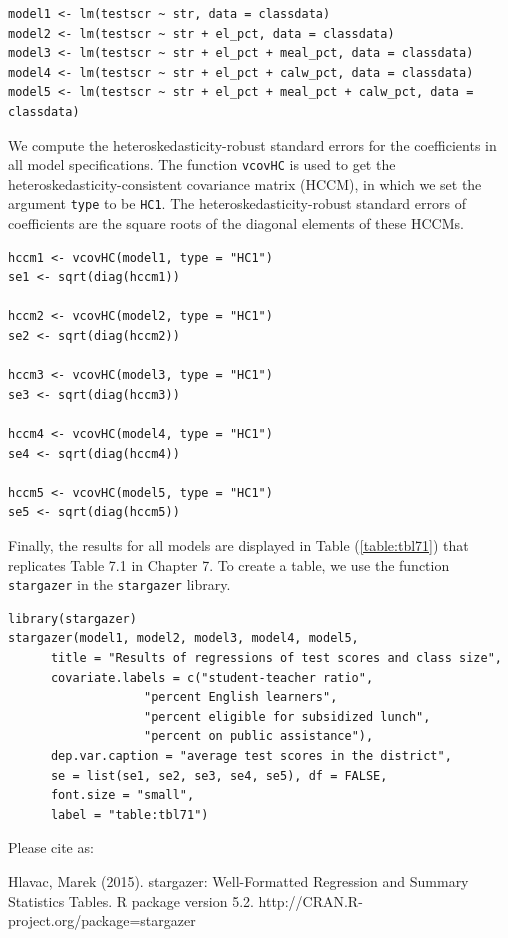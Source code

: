 \documentclass[a4paper,11pt]{article}
\begin{document}
\begin{verbatim}
model1 <- lm(testscr ~ str, data = classdata)
model2 <- lm(testscr ~ str + el_pct, data = classdata)
model3 <- lm(testscr ~ str + el_pct + meal_pct, data = classdata)
model4 <- lm(testscr ~ str + el_pct + calw_pct, data = classdata)
model5 <- lm(testscr ~ str + el_pct + meal_pct + calw_pct, data = classdata)
\end{verbatim}

We compute the heteroskedasticity-robust standard errors for the
coefficients in all model specifications. The function \texttt{vcovHC} is
used to get the heteroskedasticity-consistent covariance matrix (HCCM), in
which we set the argument \texttt{type} to be \texttt{HC1}. The
heteroskedasticity-robust standard errors of coefficients are the
square roots of the diagonal elements of these HCCMs.

\begin{verbatim}
hccm1 <- vcovHC(model1, type = "HC1")
se1 <- sqrt(diag(hccm1))

hccm2 <- vcovHC(model2, type = "HC1")
se2 <- sqrt(diag(hccm2))

hccm3 <- vcovHC(model3, type = "HC1")
se3 <- sqrt(diag(hccm3))

hccm4 <- vcovHC(model4, type = "HC1")
se4 <- sqrt(diag(hccm4))

hccm5 <- vcovHC(model5, type = "HC1")
se5 <- sqrt(diag(hccm5))
\end{verbatim}

Finally, the results for all models are displayed in Table
(\ref{table:tbl71}) that replicates Table 7.1 in Chapter 7. To create
a \latex table, we use the function \texttt{stargazer} in the \texttt{stargazer}
library.

\begin{verbatim}
library(stargazer)
stargazer(model1, model2, model3, model4, model5,
	  title = "Results of regressions of test scores and class size",
	  covariate.labels = c("student-teacher ratio",
			       "percent English learners",
			       "percent eligible for subsidized lunch",
			       "percent on public assistance"),
	  dep.var.caption = "average test scores in the district",
	  se = list(se1, se2, se3, se4, se5), df = FALSE,
	  font.size = "small",
	  label = "table:tbl71")
\end{verbatim}


Please cite as:

 Hlavac, Marek (2015). stargazer: Well-Formatted Regression and Summary Statistics Tables.
 R package version 5.2. http://CRAN.R-project.org/package=stargazer
\end{document}
